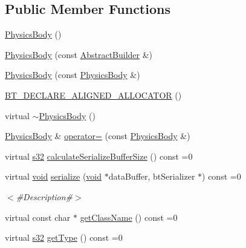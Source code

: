 \subsection*{Public Member Functions}
\begin{DoxyCompactItemize}
\item 
\mbox{\hyperlink{classnjli_1_1_physics_body_ad68e3bd30ca09693f5b03855d020923b}{Physics\+Body}} ()
\item 
\mbox{\hyperlink{classnjli_1_1_physics_body_a58cbc549412fc623f35276d2f18b8785}{Physics\+Body}} (const \mbox{\hyperlink{classnjli_1_1_abstract_builder}{Abstract\+Builder}} \&)
\item 
\mbox{\hyperlink{classnjli_1_1_physics_body_ae72cb51b910158466d481481e1042a2e}{Physics\+Body}} (const \mbox{\hyperlink{classnjli_1_1_physics_body}{Physics\+Body}} \&)
\item 
\mbox{\hyperlink{classnjli_1_1_physics_body_aecae8b7ddd0550b4f685326bf2a723da}{B\+T\+\_\+\+D\+E\+C\+L\+A\+R\+E\+\_\+\+A\+L\+I\+G\+N\+E\+D\+\_\+\+A\+L\+L\+O\+C\+A\+T\+OR}} ()
\item 
virtual \mbox{\hyperlink{classnjli_1_1_physics_body_a181de210c6f8af7a7ec4ccbc5198e969}{$\sim$\+Physics\+Body}} ()
\item 
\mbox{\hyperlink{classnjli_1_1_physics_body}{Physics\+Body}} \& \mbox{\hyperlink{classnjli_1_1_physics_body_a4259c9604cec6377e90bbf71b15778a3}{operator=}} (const \mbox{\hyperlink{classnjli_1_1_physics_body}{Physics\+Body}} \&)
\item 
virtual \mbox{\hyperlink{_util_8h_aa62c75d314a0d1f37f79c4b73b2292e2}{s32}} \mbox{\hyperlink{classnjli_1_1_physics_body_a21bdbc459532f004dc4cd0e9c99a4765}{calculate\+Serialize\+Buffer\+Size}} () const =0
\item 
virtual \mbox{\hyperlink{_thread_8h_af1e856da2e658414cb2456cb6f7ebc66}{void}} \mbox{\hyperlink{classnjli_1_1_physics_body_a3c40378e7f3033557ec6adf9428b6a9d}{serialize}} (\mbox{\hyperlink{_thread_8h_af1e856da2e658414cb2456cb6f7ebc66}{void}} $\ast$data\+Buffer, bt\+Serializer $\ast$) const =0
\begin{DoxyCompactList}\small\item\em $<$\#\+Description\#$>$ \end{DoxyCompactList}\item 
virtual const char $\ast$ \mbox{\hyperlink{classnjli_1_1_physics_body_a9ba235d39a1b994f22a13edeff862ba3}{get\+Class\+Name}} () const =0
\item 
virtual \mbox{\hyperlink{_util_8h_aa62c75d314a0d1f37f79c4b73b2292e2}{s32}} \mbox{\hyperlink{classnjli_1_1_physics_body_a1338648bed55e4ca2d3c50d953fd60c4}{get\+Type}} () const =0

\end{DoxyCompactItemize}
